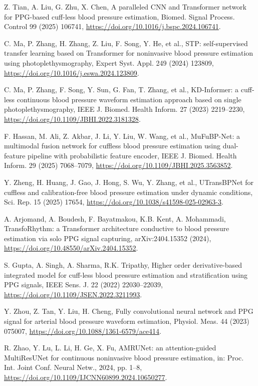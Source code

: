 \documentclass[preprint,12pt]{elsarticle}
\begin{document}
\begin{enumerate}[label={[\arabic*]},leftmargin=2.2em]
\item Z. Tian, A. Liu, G. Zhu, X. Chen, A paralleled CNN and Transformer network for PPG-based cuff-less blood pressure estimation, Biomed. Signal Process. Control 99 (2025) 106741, \url{https://doi.org/10.1016/j.bspc.2024.106741}.
\item C. Ma, P. Zhang, H. Zhang, Z. Liu, F. Song, Y. He, et al., STP: self-supervised transfer learning based on Transformer for noninvasive blood pressure estimation using photoplethysmography, Expert Syst. Appl. 249 (2024) 123809, \url{https://doi.org/10.1016/j.eswa.2024.123809}.
\item C. Ma, P. Zhang, F. Song, Y. Sun, G. Fan, T. Zhang, et al., KD-Informer: a cuff-less continuous blood pressure waveform estimation approach based on single photoplethysmography, IEEE J. Biomed. Health Inform. 27 (2023) 2219--2230, \url{https://doi.org/10.1109/JBHI.2022.3181328}.
\item F. Hassan, M. Ali, Z. Akbar, J. Li, Y. Liu, W. Wang, et al., MuFuBP-Net: a multimodal fusion network for cuffless blood pressure estimation using dual-feature pipeline with probabilistic feature encoder, IEEE J. Biomed. Health Inform. 29 (2025) 7068--7079, \url{https://doi.org/10.1109/JBHI.2025.3563852}.
\item Y. Zheng, H. Huang, J. Gao, J. Hong, S. Wu, Y. Zhang, et al., UTransBPNet for cuffless and calibration-free blood pressure estimation under dynamic conditions, Sci. Rep. 15 (2025) 17654, \url{https://doi.org/10.1038/s41598-025-02963-3}.
\item A. Arjomand, A. Boudesh, F. Bayatmakou, K.B. Kent, A. Mohammadi, TransfoRhythm: a Transformer architecture conductive to blood pressure estimation via solo PPG signal capturing, arXiv:2404.15352 (2024), \url{https://doi.org/10.48550/arXiv.2404.15352}.
\item S. Gupta, A. Singh, A. Sharma, R.K. Tripathy, Higher order derivative-based integrated model for cuff-less blood pressure estimation and stratification using PPG signals, IEEE Sens. J. 22 (2022) 22030--22039, \url{https://doi.org/10.1109/JSEN.2022.3211993}.
\item Y. Zhou, Z. Tan, Y. Liu, H. Cheng, Fully convolutional neural network and PPG signal for arterial blood pressure waveform estimation, Physiol. Meas. 44 (2023) 075007, \url{https://doi.org/10.1088/1361-6579/ace414}.
\item R. Zhao, Y. Lu, L. Li, H. Ge, X. Fu, AMRUNet: an attention-guided MultiResUNet for continuous noninvasive blood pressure estimation, in: Proc. Int. Joint Conf. Neural Netw., 2024, pp. 1--8, \url{https://doi.org/10.1109/IJCNN60899.2024.10650277}.

\end{enumerate}
\end{document}
